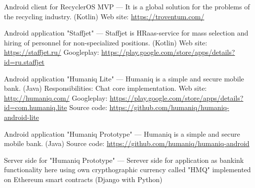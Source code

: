 \begin{cventries}
{\begin{cvitems}
{    }
    \item {
        \begin{flushleft}
            Android client for RecyclerOS MVP — It is a global solution for the problems of the recycling industry. (Kotlin)\linebreak
            Web site: \url{https://troventum.com/}\linebreak
        \end{flushleft}
    }
    \item {
        \begin{flushleft}
            Android application "Staffjet" --- Staffjet is HRaas-service for mass selection and hiring of personnel for non-specialized positions. (Kotlin)\linebreak
            Web site: \url{https://staffjet.ru/}\linebreak
            Googleplay: \url{https://play.google.com/store/apps/details?id=ru.staffjet}\linebreak
        \end{flushleft}
    }
    \item {
        \begin{flushleft}
            Android application "Humaniq Lite" --- Humaniq is a simple and secure mobile bank. (Java)\linebreak
            Responsibilities: Chat core implementation.\linebreak
            Web site: \url{http://humaniq.com/}\linebreak
            Googleplay: \url{https://play.google.com/store/apps/details?id=com.humaniq.lite}\linebreak
            Source code: \url{https://github.com/humaniq/humaniq-android-lite}\linebreak
        \end{flushleft}
    }
    \item {
        \begin{flushleft}
            Android application "Humaniq Prototype" --- Humaniq is a simple and secure mobile bank. (Java)\linebreak
            Source code: \url{https://github.com/humaniq/humaniq-android}\linebreak
        \end{flushleft}
    }
    \item {
        \begin{flushleft}
            Server side for "Humaniq Prototype" ---
            Serever side for application as bankink functionality here using own crypthographic currency called "HMQ" implemented on Ethereum smart contracts (Django with Python)\linebreak

\end{flushleft}}
\end{cvitems}}
\end{cventries}
